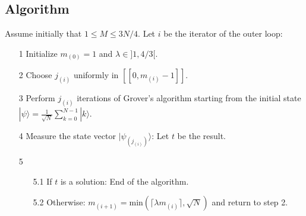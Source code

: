 \subsection{Algorithm}
Assume initially that $1 \leq M \leq 3N/4$. Let $i$ be the iterator of the outer loop:
\begin{itemize}
	\item[1] Initialize $m_{(0)}=1$ and $\lambda \in ]1, 4/3[$.
	\item[2] Choose $j_{(i)}$ uniformly in $[\![0, m_{(i)}-1]\!]$.
	\item[3] Perform $j_{(i)}$ iterations of Grover's algorithm starting from the initial state $| \psi \rangle = \frac{1}{\sqrt{N}} \sum_{k=0}^{N-1} |k\rangle$.
	\item[4] Measure the state vector $| \psi_{(j_{(i)})} \rangle$: Let $t$ be the result.
	\item[5]
	\begin{itemize}
    	\item[5.1] If $t$ is a solution: End of the algorithm.
    	\item[5.2] Otherwise: $m_{(i+1)} = \mathrm{min}(\lceil \lambda m_{(i)} \rceil, \sqrt{N})$ and return to step 2.
	\end{itemize}
\end{itemize}


